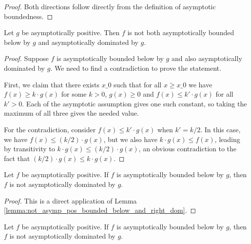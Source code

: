 \begin{proof}
    \leanok
    Both directions follow directly from the definition of asymptotic boundedness. 
\end{proof}

\begin{lemma}
    \label{lemma:not_asymp_pos_bounded_below_and_right_dom}
    \leanok
    Let $g$ be asymptotically positive. Then $f$ is not both asymptotically bounded 
    below by $g$ and asymptotically dominated by $g$.
\end{lemma}

\begin{proof}
    \leanok
    Suppose $f$ is asymptotically bounded below by $g$ and also asymptotically dominated
    by $g$. We need to find a contradiction to prove the statement. 

    First, we claim that there exists $x\_0$ such that for all $x \ge x\_0$ we have 
    $f(x) \ge k \cdot g(x)$ for some $k > 0$, $g(x) \ge 0$ and $f(x) \le k' \cdot g(x)$ 
    for all $k' > 0$. Each of the asymptotic assumption gives one such constant, so
    taking the maximum of all three gives the needed value.

    For the contradiction, consider $f(x) \le k' \cdot g(x)$ when $k' = k / 2$.
    In this case, we have $f(x) \le (k / 2) \cdot g(x)$, but we also have
    $k \cdot g(x) \le f(x)$, leading by transitivity to $k \cdot g(x) \le (k / 2) \cdot g(x)$,
    an obvious contradiction to the fact that $(k / 2) \cdot g(x) \le k \cdot g(x)$.
\end{proof}

\begin{theorem}
    \label{thm:not_asymp_pos_right_dom_of_bounded_below}
    \leanok
    Let $f$ be asymptotically positive. If $f$ is asymptotically bounded below by $g$, 
    then $f$ is not asymptotically dominated by $g$.
\end{theorem}

\begin{proof}
    \leanok
    This is a direct application of Lemma \ref{lemma:not_asymp_pos_bounded_below_and_right_dom}. 
\end{proof}

\begin{theorem}
    \label{thm:not_asymp_pos_bounded_below_of_right_dom}
    \leanok
    Let $f$ be asymptotically positive. If $f$ is asymptotically bounded below by $g$, 
    then $f$ is not asymptotically dominated by $g$.
\end{theorem}

